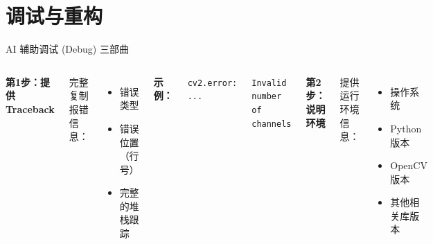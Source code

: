 
\section{调试与重构}


\begin{frame}{AI 辅助调试 (Debug) 三部曲}
	\begin{center}
	\end{center}

	\vspace{0.3cm}

	\begin{columns}
		\textbf{第1步：提供 Traceback}

		完整复制报错信息：
		\begin{itemize}
			\item 错误类型
			\item 错误位置（行号）
			\item 完整的堆栈跟踪
		\end{itemize}

		\textbf{示例：}

		\texttt{cv2.error: ...}

		\texttt{Invalid number of channels}

		\textbf{第2步：说明环境}

		提供运行环境信息：
		\begin{itemize}
			\item 操作系统
			\item Python 版本
			\item OpenCV 版本
			\item 其他相关库版本
		\end{itemize}


\end{columns}
\end{frame}

